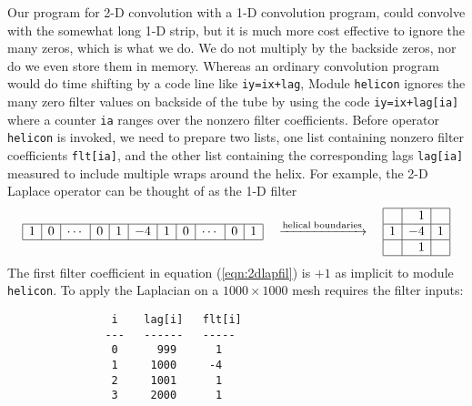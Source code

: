 \par
Our program for 2-D convolution with a 1-D convolution program,
could convolve with the somewhat long 1-D strip,
but it is much more cost effective to ignore the many zeros,
which is what we do.
We do not multiply by the backside zeros, nor do we even store them in memory.
Whereas an ordinary convolution program would do time shifting
by a code line like {\tt iy=ix+lag},
Module
\texttt{helicon} 
ignores the many zero filter values on backside of the tube
by using the code {\tt iy=ix+lag[ia]}
where a counter {\tt ia} ranges over the nonzero filter coefficients.
Before operator {\tt helicon} is invoked,
we need to prepare two lists,
one list containing nonzero filter coefficients {\tt flt[ia]},
and the other list containing the corresponding lags {\tt lag[ia]}
measured to include multiple wraps around the helix.
For example, the 2-D Laplace operator
can be thought of as the 1-D filter
\begin{equation}
\label{eqn:2dlapfil}
\begin{array}{|r|r|r|r|r|r|r|r|r|r|r|r|r|r|r|} \hline
1&0&\cdots&0&1&-4&1&0& \cdots&0&1
\\ \hline
\end{array}
%
\quad
\xrightarrow{\rm helical \; boundaries}
\quad
\begin{array}{|r|r|r|}  \hline
& 1 & \\
\hline
1 & -4 & 1\\
\hline
& 1 & \\
\hline
\end{array}
\end{equation}
%
%
%
The first filter coefficient in equation (\ref{eqn:2dlapfil})
is $+1$ as implicit to module {\tt helicon}.
To apply the Laplacian on a $1000\times 1000$ mesh
requires the filter inputs:
\par\noindent
\footnotesize
\begin{verbatim}
                i    lag[i]   flt[i]
               ---   ------   -----
                0      999      1
                1     1000     -4
                2     1001      1
                3     2000      1
\end{verbatim}
\normalsize

